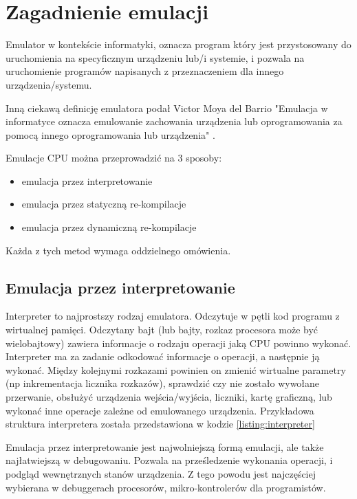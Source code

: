 \chapter{Zagadnienie emulacji}
	
	Emulator w kontekście informatyki, oznacza program który jest przystosowany do uruchomienia na specyficznym urządzeniu lub/i systemie, i pozwala na uruchomienie programów napisanych z przeznaczeniem dla innego urządzenia/systemu\cite{howDoIWriteAnEmulator}. 
	
	Inną ciekawą definicję emulatora podał Victor Moya del Barrio "Emulacja w informatyce oznacza emulowanie zachowania urządzenia lub oprogramowania za pomocą innego oprogramowania lub urządzenia"
	\cite{studyofthetechniquesforemulationprogramming}.
		
	Emulacje CPU można przeprowadzić na 3 sposoby:\cite{fms_komkon_org_howto}	
	\begin{itemize}  
		\item emulacja przez interpretowanie
		\item emulacja przez statyczną re-kompilacje
		\item emulacja przez dynamiczną re-kompilacje
	\end{itemize} 
	Każda z tych metod wymaga oddzielnego omówienia.
	
	\section{Emulacja przez interpretowanie}
	Interpreter to najprostszy rodzaj emulatora. Odczytuje w pętli kod programu z wirtualnej pamięci. Odczytany bajt (lub bajty, rozkaz procesora może być wielobajtowy) zawiera informacje o rodzaju operacji jaką CPU powinno wykonać. Interpreter ma za zadanie odkodować informacje o operacji, a następnie ją wykonać. Między kolejnymi rozkazami powinien on zmienić wirtualne parametry (np inkrementacja licznika rozkazów), sprawdzić czy nie zostało wywołane przerwanie, obsłużyć urządzenia wejścia/wyjścia, liczniki, kartę graficzną, lub wykonać inne operacje zależne od emulowanego urządzenia. Przykładowa struktura interpretera została przedstawiona w kodzie  \ref{listing:interpreter}
		
	
	
	Emulacja przez interpretowanie jest najwolniejszą formą emulacji, ale także najłatwiejszą w debugowaniu. Pozwala na prześledzenie wykonania operacji, i podgląd wewnętrznych stanów urządzenia. Z tego powodu jest najczęściej wybierana w debuggerach procesorów, mikro-kontrolerów dla programistów.
	
